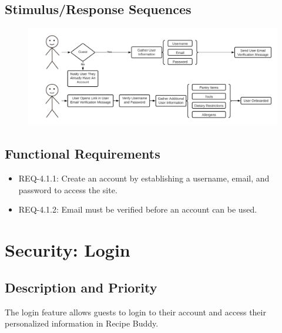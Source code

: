 \documentclass{scrreprt}
\begin{document}
\subsection{Stimulus/Response Sequences}

\begin{figure}[H]\centering
    \includegraphics[width=\columnwidth]{FlowCharts/Security-Account-Creation.png}
\end{figure}

\subsection{\gls{Functional Requirements}}

\begin{itemize}
    \item REQ-4.1.1: Create an account by establishing a username, email, and password to access the site.
    \item REQ-4.1.2: Email must be verified before an account can be used.
\end{itemize}

\section{Security: Login}

\subsection{Description and Priority}

The login feature allows guests to login to their account and access their personalized information in \gls{Recipe Buddy}.
\end{document}
